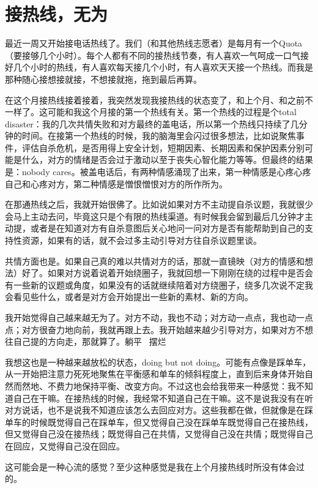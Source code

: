 \chapter{接热线，无为}





最近一周又开始接电话热线了。我们（和其他热线志愿者）是每月有一个Quota（要接够几个小时）。每个人都有不同的接热线节奏，有人喜欢一气呵成\pozhehao{}一口气接好几个小时的热线，有人喜欢每天接几个小时，有人喜欢天天接一个热线。而我是那种随心接\pozhehao{}想接就接，不想接就拖，拖到最后再算。

在这个月接热线接着接着，我突然发现我接热线的状态变了，和上个月、和之前不一样了。这可能和我这个月接的第一个热线有关。第一个热线的过程是个total disaster：我的几次共情失败和对方最终的盖电话，所以第一个热线只持续了几分钟的时间。在接第一个热线的时候，我的脑海里会闪过很多想法，比如说聚焦事件，评估自杀危机，是否用得上安全计划，短期因素、长期因素和保护因素分别可能是什么，对方的情绪是否会过于激动以至于丧失心智化能力等等。但最终的结果是：nobody cares。被盖电话后，有两种情感涌现了出来，第一种情感是心疼\pozhehao{}心疼自己和心疼对方，第二种情感是憎恨\pozhehao{}憎恨对方的所作所为。

在那通热线之后，我就开始很佛了。比如说如果对方不主动提自杀议题，我就很少会马上主动去问，毕竟这只是个有限的热线渠道。有时候我会留到最后几分钟才主动提，或者是在知道对方有自杀意图后关心地问一问对方是否有能帮助到自己的支持性资源，如果有的话，就不会过多主动引导对方往自杀议题里谈。

共情方面也是。如果自己真的难以共情对方的话，那就一直镜映（对方的情感和想法）好了。如果对方说着说着开始绕圈子，我就回想一下刚刚在绕的过程中是否会有一些新的议题或角度，如果没有的话就继续陪着对方绕圈子，绕多几次说不定我会看见些什么，或者是对方会开始提出一些新的素材、新的方向。

我开始觉得自己越来越无为了。对方不动，我也不动；对方动一点点，我也动一点点；对方很奋力地向前，我就再跟上去。我开始越来越少引导对方，如果对方不想往自己提的方向走，那就算了。躺平~ 摆烂~

我想这也是一种越来越放松的状态，doing but not doing。可能有点像是踩单车，从一开始把注意力死死地聚焦在平衡感和单车的倾斜程度上，直到后来身体开始自然而然地、不费力地保持平衡、改变方向。不过这也会给我带来一种感觉：我不知道自己在干嘛。在接热线的时候，我经常不知道自己在干嘛。这不是说我没有在听对方说话，也不是说我不知道应该怎么去回应对方。这些我都在做，但就像是在踩单车的时候\pozhehao{}既觉得自己在踩单车，但又觉得自己没在踩单车\pozhehao{}既觉得自己在接热线，但又觉得自己没在接热线；既觉得自己在共情，又觉得自己没在共情；既觉得自己在回应，又觉得自己没在回应。

这可能会是一种心流的感觉？至少这种感觉是我在上个月接热线时所没有体会过的。

